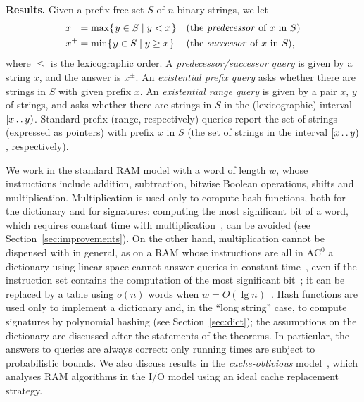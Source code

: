 \documentclass[a4paper]{article}
\newcommand{\?}{\mskip1.5mu}
\def\..{\,\mathpunct{\ldotp\ldotp}} %
\begin{document}
\noindent\textbf{Results.} Given a prefix-free set $S$ of $n$ binary
strings, we let
\begin{align*}
	x^- &= \max\{\?y \in S \mid y< x\?\} &&\text{(the \emph{predecessor} of
	$x$ in $S$)}\\
	x^+ &= \min\{\?y \in S \mid y\geq x\?\} && \text{(the \emph{successor} of
	$x$ in $S$)},
\end{align*}
where $\leq$ is the lexicographic order. A \emph{predecessor/successor query} is
given by a string $x$, and the answer is $x^\pm$. An \emph{existential prefix
query} asks whether there are strings in $S$ with given prefix $x$. An
\emph{existential range query} is given by a pair $x$, $y$ of strings, and asks
whether there are strings in $S$ in the (lexicographic) interval $[x\..y)$.
Standard prefix (range, respectively) queries report the set of strings
(expressed as pointers) with prefix $x$ in $S$ (the set of strings in the
interval $[x\..y)$, respectively).

We work in the standard RAM model with a word of length $w$, whose instructions include addition, subtraction,
bitwise Boolean operations, shifts and multiplication. Multiplication is used only to compute hash functions, both for the
dictionary and for signatures: computing the most significant bit of a word, which requires constant time with
multiplication~\cite[Section~5]{FrWSITBFT}, can be avoided (see Section~\ref{sec:improvements}). On the other hand, multiplication cannot
be dispensed with in general, as on a RAM whose instructions are all in $\mathrm{AC}^0$ a dictionary using linear
space cannot answer queries in constant time~\cite{Andersson1996Static}, even if the instruction set contains the computation of the
most significant bit~\cite{Thorup2003AC0}; it can be replaced by a table using $o(n)$ words when $w=O(\lg n)$~\cite{Thorup2003AC0}.
Hash functions are used only to implement a dictionary and, in the ``long
string'' case, to compute signatures by polynomial hashing (see Section~\ref{sec:dict}); the assumptions on the dictionary 
are discussed after the statements of the theorems. 
In particular, the answers to queries are always correct: only running times are subject to probabilistic bounds. 
We also discuss results in the \emph{cache-oblivious} model~\cite{FLPCOA}, which
analyses RAM algorithms in the I/O model using an ideal cache replacement
strategy.
\end{document}

